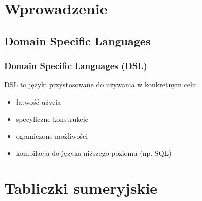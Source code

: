 \section{Wprowadzenie}

\subsection{Domain Specific Languages}


\begin{frame}
     \frametitle{Domain Specific Languages (DSL)}
     
     DSL to języki przystosowane do używania w konkretnym celu.
     \begin{itemize}
          \item
          łatwość użycia
          \item
          specyficzne konstrukcje
          \item 
          ograniczone możliwości
          \item
          kompilacja do języka niższego poziomu (np. SQL)
     \end{itemize}


\end{frame}

\section{Tabliczki sumeryjskie}


